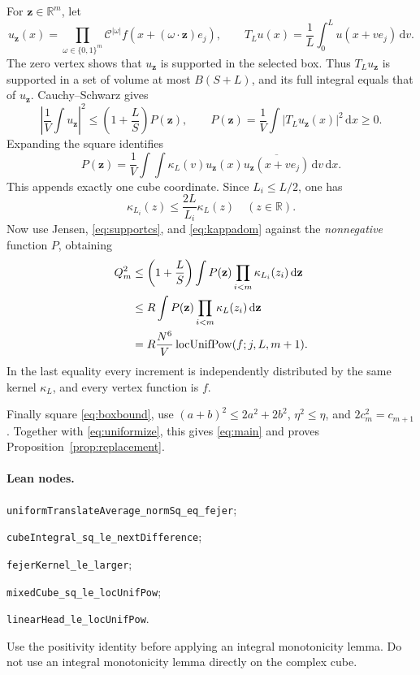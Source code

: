 \documentclass[11pt]{article}
\newcommand{\R}{\mathbb R}
\newcommand{\CC}{\mathcal C}
\newcommand{\dd}{\,\mathrm d}
\newcommand{\idname}[1]{\nolinkurl{#1}}
\theoremstyle{definition}\newtheorem{definition}[lemma]{Definition}
\begin{document}
For $\mathbf z\in\R^m$, let
\[
 u_{\mathbf z}(x)=\prod_{\omega\in\{0,1\}^m}\CC^{|\omega|}
                         f(x+(\omega\cdot\mathbf z)e_j),\qquad
 T_Lu(x)=\frac1L\int_0^L u(x+ve_j)\dd v.
\]
The zero vertex shows that $u_{\mathbf z}$ is supported in the selected box. Thus $T_Lu_{\mathbf z}$ is supported in a set of volume at most $B(S+L)$, and its full integral equals that of $u_{\mathbf z}$. Cauchy--Schwarz gives
\begin{equation}\label{eq:supportcs}
 \left|\frac1V\int u_{\mathbf z}\right|^2
 \leq\left(1+\frac LS\right)P(\mathbf z),\qquad
 P(\mathbf z)=\frac1V\int|T_Lu_{\mathbf z}(x)|^2\dd x\geq0.
\end{equation}
Expanding the square identifies
\[
 P(\mathbf z)=\frac1V\int\int\kappa_L(v)
       u_{\mathbf z}(x)\overline{u_{\mathbf z}(x+ve_j)}\dd v\dd x.
\]
This appends exactly one cube coordinate. Since $L_i\leq L/2$, one has
\begin{equation}\label{eq:kappadom}
 \kappa_{L_i}(z)\leq\frac{2L}{L_i}\kappa_L(z)\quad(z\in\R).
\end{equation}
Now use Jensen, \eqref{eq:supportcs}, and \eqref{eq:kappadom} against the \emph{nonnegative} function $P$, obtaining
\begin{align}
 Q_m^2
 &\leq\left(1+\frac LS\right)
       \int P(\mathbf z)\prod_{i<m}\kappa_{L_i}(z_i)\dd\mathbf z\notag\\
 &\leq R\int P(\mathbf z)\prod_{i<m}\kappa_L(z_i)\dd\mathbf z\notag\\
 &=R\frac{N^6}{V}\operatorname{locUnifPow}(f;j,L,m+1).
 \label{eq:uniformize}
\end{align}
In the last equality every increment is independently distributed by the same kernel $\kappa_L$, and every vertex function is $f$.

Finally square \eqref{eq:boxbound}, use $(a+b)^2\leq2a^2+2b^2$, $\eta^2\leq\eta$, and $2c_m^2=c_{m+1}$. Together with \eqref{eq:uniformize}, this gives \eqref{eq:main} and proves Proposition~\ref{prop:replacement}.

\paragraph{Lean nodes.}
\mbox{}\par
\noindent\idname{uniformTranslateAverage_normSq_eq_fejer};\par
\noindent\idname{cubeIntegral_sq_le_nextDifference};\par
\noindent\idname{fejerKernel_le_larger};\par
\noindent\idname{mixedCube_sq_le_locUnifPow};\par
\noindent\idname{linearHead_le_locUnifPow}.\par
Use the positivity identity before applying an integral monotonicity lemma. Do not use an integral monotonicity lemma directly on the complex cube.
\end{document}
